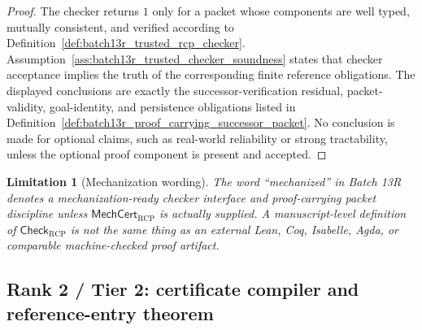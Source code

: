 \documentclass[11pt]{article}
\newtheorem{limitation}[theorem]{Limitation}
\newcommand{\1}{\mathbf{1}}
\newcommand{\RCP}{\mathrm{RCP}}
\begin{document}
\begin{proof}
The checker returns \(1\) only for a packet whose components are well typed, mutually consistent, and verified according to Definition~\ref{def:batch13r_trusted_rcp_checker}.  Assumption~\ref{ass:batch13r_trusted_checker_soundness} states that checker acceptance implies the truth of the corresponding finite reference obligations.  The displayed conclusions are exactly the successor-verification residual, packet-validity, goal-identity, and persistence obligations listed in Definition~\ref{def:batch13r_proof_carrying_successor_packet}.  No conclusion is made for optional claims, such as real-world reliability or strong tractability, unless the optional proof component is present and accepted.
\end{proof}

\begin{limitation}[Mechanization wording]
The word ``mechanized'' in Batch 13R denotes a mechanization-ready checker interface and proof-carrying packet discipline unless \(\mathsf{MechCert}_{\RCP}\) is actually supplied.  A manuscript-level definition of \(\mathsf{Check}_{\RCP}\) is not the same thing as an external Lean, Coq, Isabelle, Agda, or comparable machine-checked proof artifact.
\end{limitation}

\subsection{Rank 2 / Tier 2: certificate compiler and reference-entry theorem}
\end{document}

